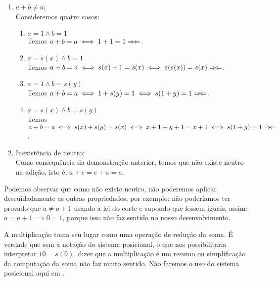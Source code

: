 \documentclass[../main.tex]{subfiles}
\begin{document}
\begin{dem}
\begin{enumerate}[label=(\roman*)]
        \item $a + b \neq a$;\\
            Consideremos quatro casos:
            \begin{enumerate}[label=(\arabic*)]
            \item $a=1 \land b=1$ \\
                Temos $a+b=a \iff 1+1=1 \Rightarrow\!\Leftarrow$. \\
            \item $a=s(x) \land b=1$ \\
                Temos $a+b=a \iff s(x) + 1 = s(x) \iff s(s(x)) = s(x) \Rightarrow\!\Leftarrow$. \\
            \item $a=1 \land b=s(y)$ \\
                Temos $a+b=a \iff 1+ s(y) = 1 \iff s(1+y) = 1 \Rightarrow\!\Leftarrow$. \\
            \item $a=s(x) \land b=s(y)$ \\
                Temos $a+b=a \iff s(x) + s(y) = s(x) \iff x + 1 + y + 1 = x + 1 \iff s(1 + y) = 1 \Rightarrow\!\Leftarrow$.
            \end{enumerate}
    
        \item Inexistência de neutro: \\
            Como consequência da demonstração anterior, temos que não existe neutro na adição, isto é, $a + e = e + a = a$.
    \end{enumerate}
\end{dem}
 
Podemos observar que como não existe neutro, não poderemos aplicar descuidadamente as outras propriedades, por exemplo: não poderíamos ter provado que $a \neq a+ 1 $ usando a lei do corte e supondo que fossem iguais, assim: $a = a+ 1 \implies 0 = 1$, porque isso não faz sentido no nosso desenvolvimento.

A multiplicação toma seu lugar como uma operação de redução da soma. É verdade que sem a notação do sistema posicional, o que nos possibilitaria interpretar $10 = s(9)$, dizer que a multiplicação é um resumo ou simplificação da computação da soma não faz muito sentido. Não faremos o uso do sistema posicional aqui em \N. 
\end{document}
